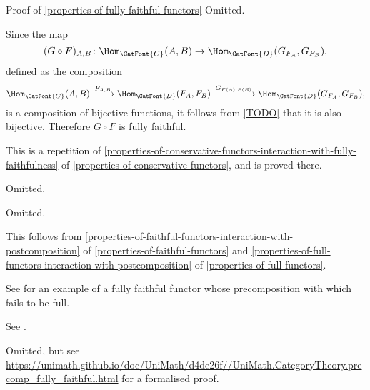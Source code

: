 \begin{Proof}{Proof of \cref{properties-of-fully-faithful-functors}}%
    Omitted.

    Since the map
    \[
        (G\circ F)_{A,B}
        \colon
        \Hom_{\CatFont{C}}(A,B)
        \to
        \Hom_{\CatFont{D}}(G_{F_{A}},G_{F_{B}}),%
    \]%
    defined as the composition
    \[
        \Hom_{\CatFont{C}}(A,B)%
        \xrightarrow{F_{A,B}}%
        \Hom_{\CatFont{D}}(F_{A},F_{B})%
        \xrightarrow{G_{F(A),F(B)}}%
        \Hom_{\CatFont{D}}(G_{F_{A}},G_{F_{B}}),%
    \]%
    is a composition of bijective functions, it follows from \cref{TODO} that it is also bijective. Therefore $G\circ F$ is fully faithful.

    This is a repetition of \cref{properties-of-conservative-functors-interaction-with-fully-faithfulness} of \cref{properties-of-conservative-functors}, and is proved there.

    Omitted.

    Omitted.

    This follows from \cref{properties-of-faithful-functors-interaction-with-postcomposition} of \cref{properties-of-faithful-functors} and \cref{properties-of-full-functors-interaction-with-postcomposition} of \cref{properties-of-full-functors}.

    See \cite{MSE733161} for an example of a fully faithful functor whose precomposition with which fails to be full.

    See \cite[Item 3]{MSE749304}.

    Omitted, but see \url{https://unimath.github.io/doc/UniMath/d4de26f//UniMath.CategoryTheory.precomp\_fully\_faithful.html} for a formalised proof.


\end{Proof}
